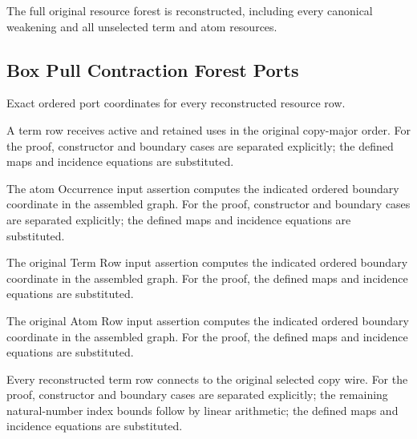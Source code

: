 The full original resource forest is reconstructed, including every canonical weakening and all unselected term and atom resources.
\par{}

\subsection{Box Pull Contraction Forest Ports}
Exact ordered port coordinates for every reconstructed resource row.

A term row receives active and retained uses in the original copy-major order.
For the proof, constructor and boundary cases are separated explicitly; the defined maps and incidence equations are substituted.
\par{}

The atom Occurrence input assertion computes the indicated ordered boundary coordinate in the assembled graph.
For the proof, constructor and boundary cases are separated explicitly; the defined maps and incidence equations are substituted.
\par{}

The original Term Row input assertion computes the indicated ordered boundary coordinate in the assembled graph.
For the proof, the defined maps and incidence equations are substituted.
\par{}

The original Atom Row input assertion computes the indicated ordered boundary coordinate in the assembled graph.
For the proof, the defined maps and incidence equations are substituted.
\par{}

Every reconstructed term row connects to the original selected copy wire.
For the proof, constructor and boundary cases are separated explicitly; the remaining natural-number index bounds follow by linear arithmetic; the defined maps and incidence equations are substituted.
\par{}

